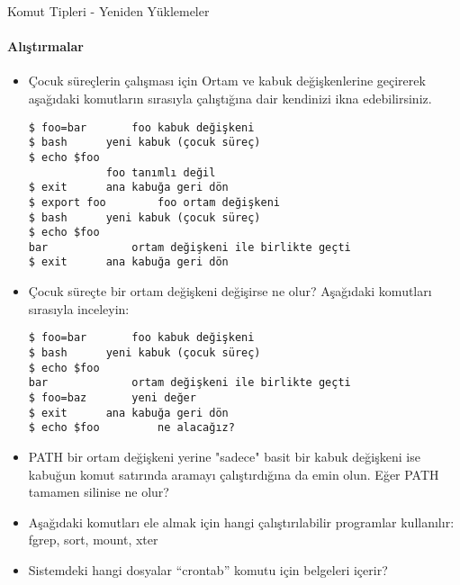\begin{section}{Komut Tipleri - Yeniden Yüklemeler}
\paragraph{Alıştırmalar}{
\begin{itemize}
\item Çocuk süreçlerin çalışması için Ortam ve kabuk değişkenlerine geçirerek aşağıdaki komutların sırasıyla çalıştığına dair kendinizi ikna edebilirsiniz.
\begin{verbatim}
$ foo=bar 		foo kabuk değişkeni
$ bash 		yeni kabuk (çocuk süreç)
$ echo $foo
			foo tanımlı değil
$ exit 		ana kabuğa geri dön
$ export foo 		foo ortam değişkeni
$ bash 		yeni kabuk (çocuk süreç)
$ echo $foo
bar 			ortam değişkeni ile birlikte geçti
$ exit 		ana kabuğa geri dön
\end{verbatim}
\item Çocuk süreçte bir ortam değişkeni değişirse ne olur? Aşağıdaki komutları sırasıyla inceleyin:
\begin{verbatim}
$ foo=bar 		foo kabuk değişkeni
$ bash 		yeni kabuk (çocuk süreç)
$ echo $foo
bar 			ortam değişkeni ile birlikte geçti
$ foo=baz 		yeni değer
$ exit 		ana kabuğa geri dön
$ echo $foo 		ne alacağız?
\end{verbatim}
\item PATH bir ortam değişkeni yerine "sadece" basit bir kabuk değişkeni ise kabuğun komut satırında aramayı çalıştırdığına da emin olun. Eğer PATH tamamen silinise ne olur?
\item Aşağıdaki komutları ele almak için hangi çalıştırılabilir programlar kullanılır: fgrep, sort, mount, xter
\item Sistemdeki hangi dosyalar “crontab” komutu için belgeleri içerir?
\end{itemize}}
\end{section}
